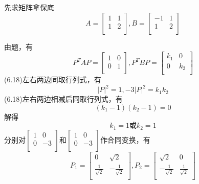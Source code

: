 \documentclass[lang=cn,10pt]{elegantbook}
\begin{document}
\begin{solution}
	
	先求矩阵拿保底
	\begin{equation*}
		A=\left[ \begin{matrix}
			1&		1\\
			1&		2\\
		\end{matrix} \right] ,B=\left[ \begin{matrix}
			-1&		1\\
			1&		2\\
		\end{matrix} \right] 
	\end{equation*}
	
	由题，有
	\begin{equation}
		P^{T}AP=\left[ \begin{matrix}
			1&		0\\
			0&		1\\
		\end{matrix} \right] ,P^{T}BP=\left[ \begin{matrix}
		k_{1}&		0\\
		0&		k_{2}\\
		\end{matrix} \right]
	\end{equation}
	(6.18)左右两边同取行列式，有
	\begin{equation*}
		|P|^{2}=1,-3|P|^{2}=k_{1}k_{2}
	\end{equation*}
	(6.18)左右两边相减后同取行列式，有
	\begin{equation*}
		(k_{1}-1)(k_{2}-1)=0
	\end{equation*}
	解得
	\begin{equation*}
		k_{1}=1\text{或}k_{2}=1
	\end{equation*}
	分别对$\left[ \begin{matrix}
		1&		0\\
		0&		-3\\
	\end{matrix} \right] $和$\left[ \begin{matrix}
	1&		0\\
	0&		-3\\
	\end{matrix} \right] $作合同变换，有
	\begin{equation*}
		P_{1}=\left[ \begin{matrix}
			0&		\sqrt{2}\\
			\frac{1}{\sqrt{2}}&		-\frac{1}{\sqrt{2}}\\
		\end{matrix} \right] ,P_{2}=\left[ \begin{matrix}
		\sqrt{2}&		0\\
		-\frac{1}{\sqrt{2}}&		\frac{1}{\sqrt{2}}\\
		\end{matrix} \right] 
	\end{equation*}
\end{solution}
\end{document}

